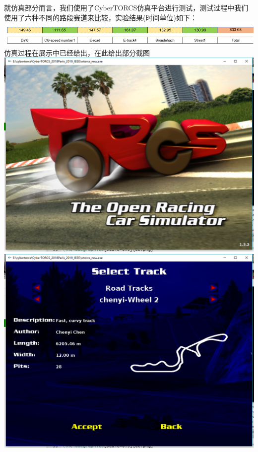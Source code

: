 \documentclass{article}
\begin{document}
就仿真部分而言，我们使用了CyberTORCS仿真平台进行测试，测试过程中我们使用了六种不同的路段赛道来比较，实验结果(时间单位)如下：
\newline
\includegraphics[scale=0.4]{res.png}
\newline\newline
仿真过程在展示中已经给出，在此给出部分截图
\newline
\includegraphics[scale=0.3]{t1.png}
\newline
\includegraphics[scale=0.3]{t2.png}
\end{document}
